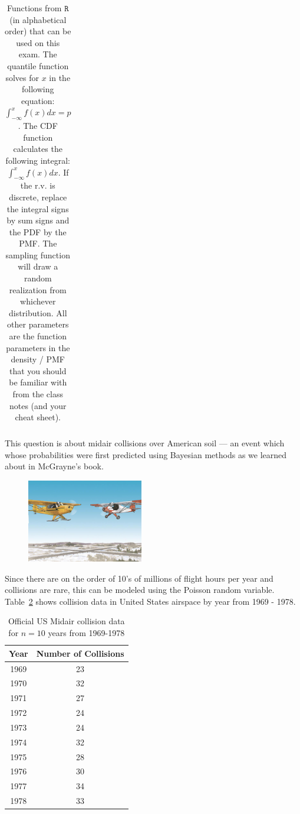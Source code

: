 \documentclass[12pt]{article}
\begin{document}
\begin{table}[htp]
\begin{tabular}{l | llll}
\end{tabular}
\caption{Functions from $\texttt{R}$ (in alphabetical order) that can be used on this exam. The quantile function solves for $x$ in the following equation: $\int_{-\infty}^x f(x) dx = p$. The CDF function calculates the following integral: $\int_{-\infty}^x f(x) dx$. If the r.v. is discrete, replace the integral signs by sum signs and the PDF by the PMF. The sampling function will draw a random realization from whichever distribution. All other parameters are the function parameters in the density / PMF that you should be familiar with from the class notes (and your cheat sheet).}
\label{tab:eqs}
\end{table}
\pagebreak

\problem This question is about midair collisions over American soil --- an event which whose probabilities were first predicted using Bayesian methods as we learned about in McGrayne's book.

\begin{figure}[htp]
\centering
\includegraphics[width=2in]{midair.jpg}
\end{figure}

Since there are on the order of 10's of millions of flight hours per year and collisions are rare, this can be modeled using the Poisson random variable. Table~\ref{tab:collision} shows collision data in United States airspace by year from 1969 - 1978.

\begin{table}[htp]
\centering
\begin{tabular}{cc}
Year & Number of Collisions \\ \hline
1969 &23 \\
1970 &32 \\
1971 &27 \\
1972 &24 \\
1973 &24 \\
1974 &32 \\
1975 &28 \\
1976 &30 \\
1977 &34 \\
1978 &33 \\
\end{tabular}
\caption{Official US Midair collision data for $n=10$ years from 1969-1978}
\label{tab:collision}
\end{table}
\end{document}
